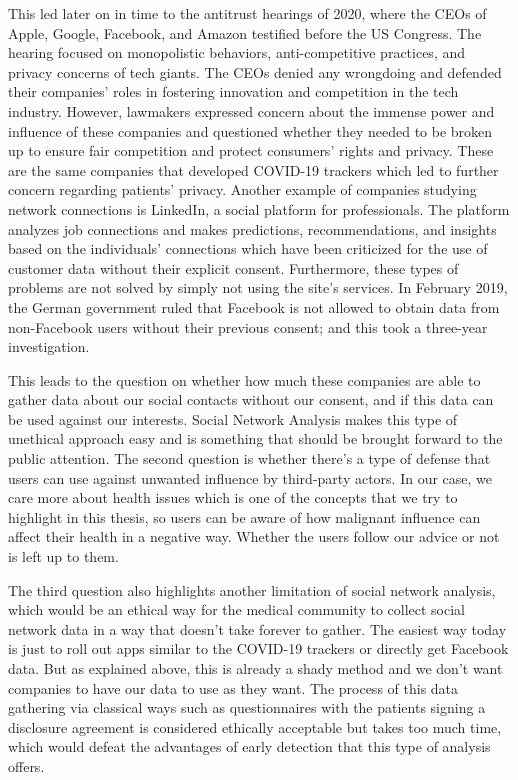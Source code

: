 This led later on in time to the antitrust hearings of 2020, where the CEOs of Apple, Google, Facebook, and Amazon testified before the US Congress. The hearing focused on monopolistic behaviors, anti-competitive practices, and privacy concerns of tech giants. The CEOs denied any wrongdoing and defended their companies' roles in fostering innovation and competition in the tech industry. However, lawmakers expressed concern about the immense power and influence of these companies and questioned whether they needed to be broken up to ensure fair competition and protect consumers' rights and privacy. These are the same companies that developed COVID-19 trackers which led to further concern regarding patients' privacy. Another example of companies studying network connections is LinkedIn, a social platform for professionals. The platform analyzes job connections and makes predictions, recommendations, and insights based on the individuals' connections which have been criticized for the use of customer data without their explicit consent. Furthermore, these types of problems are not solved by simply not using the site's services. In February 2019, the German government ruled that Facebook is not allowed to obtain data from non-Facebook users without their previous consent; and this took a three-year investigation.

This leads to the question on whether how much these companies are able to gather data about our social contacts without our consent, and if this data can be used against our interests. Social Network Analysis makes this type of unethical approach easy and is something that should be brought forward to the public attention. The second question is whether there's a type of defense that users can use against unwanted influence by third-party actors. In our case, we care more about health issues which is one of the concepts that we try to highlight in this thesis, so users can be aware of how malignant influence can affect their health in a negative way. Whether the users follow our advice or not is left up to them.

The third question also highlights another limitation of social network analysis, which would be an ethical way for the medical community to collect social network data in a way that doesn't take forever to gather. The easiest way today is just to roll out apps similar to the COVID-19 trackers or directly get Facebook data. But as explained above, this is already a shady method and we don't want companies to have our data to use as they want. The process of this data gathering via classical ways such as questionnaires with the patients signing a disclosure agreement is considered ethically acceptable but takes too much time, which would defeat the advantages of early detection that this type of analysis offers.

